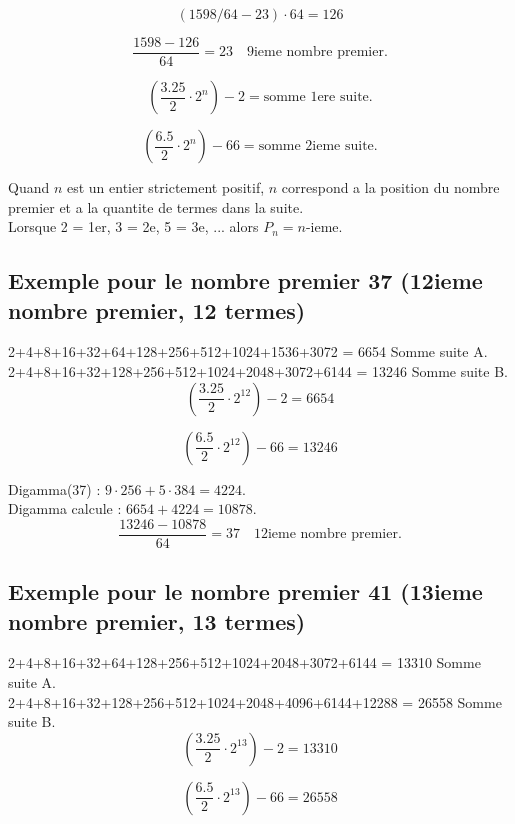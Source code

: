 \documentclass[a4paper,11pt]{article}
\begin{document}
\[
(1598/64 - 23) \cdot 64 = 126
\]

\[
\frac{1598 - 126}{64} = 23 \quad \text{9ieme nombre premier.}
\]

\[
\left(\frac{3.25}{2} \cdot 2^{n}\right) - 2 = \text{somme 1ere suite.}
\]

\[
\left(\frac{6.5}{2} \cdot 2^{n}\right) - 66 = \text{somme 2ieme suite.}
\]

Quand \(n\) est un entier strictement positif, \(n\) correspond a la position du nombre premier et a la quantite de termes dans la suite.\\
Lorsque 2 = 1er, 3 = 2e, 5 = 3e, ... alors \(P_{n} = n\)-ieme.

\bigskip

\subsection*{Exemple pour le nombre premier 37 (12ieme nombre premier, 12 termes)}

2+4+8+16+32+64+128+256+512+1024+1536+3072 = 6654 Somme suite A.\\
2+4+8+16+32+128+256+512+1024+2048+3072+6144 = 13246 Somme suite B.\\

\[
\left(\frac{3.25}{2} \cdot 2^{12}\right) - 2 = 6654
\]

\[
\left(\frac{6.5}{2} \cdot 2^{12}\right) - 66 = 13246
\]

Digamma(37) : \(9 \cdot 256 + 5 \cdot 384 = 4224\).\\
Digamma calcule : \(6654 + 4224 = 10878\).\\

\[
\frac{13246 - 10878}{64} = 37 \quad \text{12ieme nombre premier.}
\]

\bigskip

\subsection*{Exemple pour le nombre premier 41 (13ieme nombre premier, 13 termes)}

2+4+8+16+32+64+128+256+512+1024+2048+3072+6144 = 13310 Somme suite A.\\
2+4+8+16+32+128+256+512+1024+2048+4096+6144+12288 = 26558 Somme suite B.\\

\[
\left(\frac{3.25}{2} \cdot 2^{13}\right) - 2 = 13310
\]

\[
\left(\frac{6.5}{2} \cdot 2^{13}\right) - 66 = 26558
\]
\end{document}
